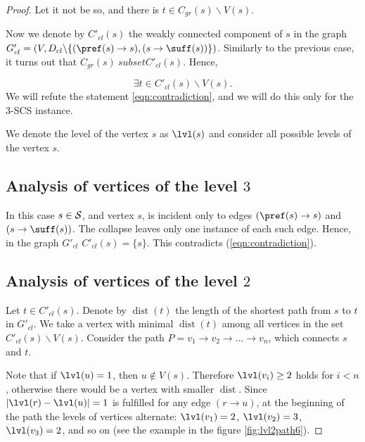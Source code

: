 \begin{proof}
Let it not be so, and there is $ t \in C_{gr} (s) \backslash V (s) $.

Now we denote by $ C'_{cl} (s) $ the weakly connected component of $s$ in the graph $ G'_{cl} = (V, D_{cl} \backslash \{(\pref (s) \to s), (s \to \suff (s)) \}) $. Similarly to the previous case, it turns out that $ C_{gr} (s) \ subset C'_{cl} (s) $. Hence,

\begin{equation}
\label{eqn:contradiction}
    \exists t \in C'_{cl}(s) \backslash V(s).
\end{equation}
We will refute the statement \ref{eqn:contradiction}, and we will do this only for the $3$-SCS instance.

We denote the level of the vertex $ s $ as $ \lvl (s) $ and consider all possible levels of the vertex $ s $.

\subsection{Analysis of vertices of the level \texorpdfstring{$3$}{3}}

In this case $ s \in {\cal S} $, and vertex $ s $, is incident only to edges $ (\pref (s) \to s)$ and $(s \to \suff (s)) $. The collapse leaves only one instance of each such edge. Hence, in the graph $ G'_{cl} $ $ C'_{cl} (s) = \{s \} $. This contradicts (\ref{eqn:contradiction}).

\subsection{Analysis of vertices of the level \texorpdfstring{$2$}{2}}

Let $ t \in C'_{cl} (s) $. Denote by $ \operatorname{dist} (t) $ the length of the shortest path from $ s $ to $ t $ in $ G'_{cl} $. We take a vertex with minimal $ \operatorname{dist} (t) $ among all vertices in the set $ C'_{cl} (s) \backslash V (s) $. Consider the path $ P = v_1 \to v_2 \to \ldots \to v_n $, which connects $ s $ and $ t $.

Note that if $ \lvl (u) = 1 $, then $ u \notin V (s) $. Therefore $ \lvl (v_i) \ge 2 $ holds for $ i<n $, otherwise there would be a vertex with smaller $ \operatorname {dist} $. Since $ | \lvl (r) - \lvl (u) | = 1 $ is fulfilled for any edge $ (r \to u) $, at the beginning of the path the levels of vertices alternate: $ \lvl (v_1) = 2 $, $ \lvl (v_2) = 3 $, $ \lvl (v_3) = 2 $, and so on (see the example in the figure \ref{fig:lvl2path6}).


\end{proof}
